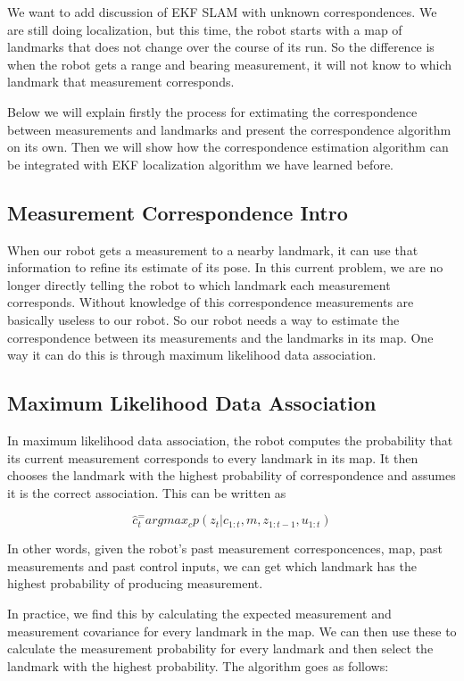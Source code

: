 \documentclass[twoside]{article}
\begin{document}
We want to add discussion of EKF SLAM with unknown correspondences. We are still doing localization, but this time, the robot starts with a map of landmarks that does not change over the course of its run. So the difference is when the robot gets a range and bearing measurement, it will not know to which landmark that measurement corresponds.

Below we will explain firstly the process for extimating the correspondence between measurements and landmarks and present the correspondence algorithm on its own. Then we will show how the correspondence estimation algorithm can be integrated with EKF localization algorithm we have learned before.

\subsection {Measurement Correspondence Intro}

When our robot gets a measurement to a nearby landmark, it can use that information to refine its estimate of its pose. In this current problem, we are no longer directly telling the robot to which landmark each measurement corresponds. Without knowledge of this correspondence measurements are basically useless to our robot. So our robot needs a way to estimate the correspondence between its measurements and the landmarks in its map. One way it can do this is through maximum likelihood data association.

\subsection {Maximum Likelihood Data Association}

In maximum likelihood data association, the robot computes the probability that its current measurement corresponds to every landmark in its map. It then chooses the landmark with the highest probability of correspondence and assumes it is the correct association. This can be written as

\begin{equation}
\hat{c}_t^=argmax_{c}p(z_t|c_{1:t},m,z_{1:t-1},u_{1:t})
\end{equation}

In other words, given the robot's past measurement corresponcences, map, past measurements and past control inputs, we can get which landmark has the highest probability of producing measurement.

In practice, we find this by calculating the expected measurement and measurement covariance for every landmark in the map. We can then use these to calculate the measurement probability for every landmark and then select the landmark with the highest probability. The algorithm goes as follows:
\end{document}

